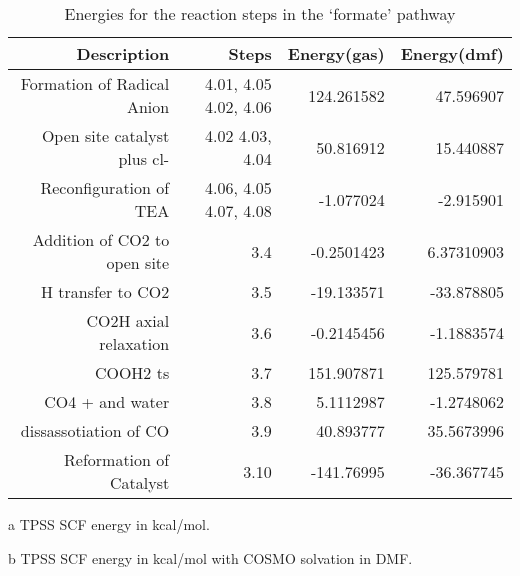 \begin{table}[!htb]
\centering
 \begin{threeparttable}
  \caption{Energies for the reaction steps in the `formate' pathway}
    \begin{tabular}{rrrr}
    \toprule
    Description & Steps & Energy(gas)\tnote{a} & Energy(dmf)\tnote{b} \\
    \midrule
    Formation of Radical Anion & 4.01, 4.05 \ce{->} 4.02, 4.06   & 124.261582 & 47.596907 \\
    Open site catalyst plus cl- & 4.02 \ce{->} 4.03, 4.04 & 50.816912 & 15.440887 \\
    Reconfiguration of TEA & 4.06, 4.05 \ce{->} 4.07, 4.08 & -1.077024 & -2.915901 \\
    \midrule
    Addition of CO2 to open site & 3.4   & -0.2501423 & 6.37310903 \\
    H transfer to CO2 & 3.5   & -19.133571 & -33.878805 \\
    CO2H axial relaxation & 3.6   & -0.2145456 & -1.1883574 \\
    COOH2 ts & 3.7   & 151.907871 & 125.579781 \\
    CO4 + and water & 3.8   & 5.1112987 & -1.2748062 \\
    dissassotiation of CO & 3.9   & 40.893777 & 35.5673996 \\
    Reformation of Catalyst & 3.10  & -141.76995 & -36.367745 \\
    \bottomrule
    \end{tabular}%
    \begin{tablenotes}
    \item [a] TPSS SCF energy in kcal/mol.
    \item [b] TPSS SCF energy in kcal/mol with COSMO solvation in DMF.
    \end{tablenotes}
  \label{tab.siderxn}%
 \end{threeparttable}
\end{table}%


